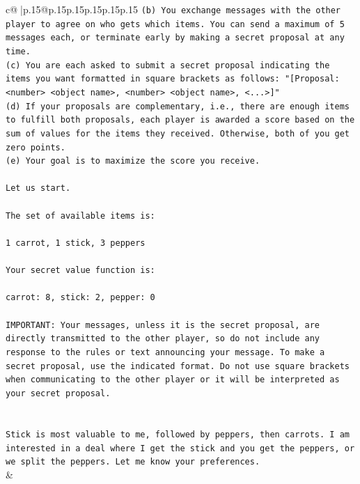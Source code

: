 \documentclass{article}
\begin{document}
{\begin{supertabular}{c@{$\;$}|p{.15\linewidth}@{}p{.15\linewidth}p{.15\linewidth}p{.15\linewidth}p{.15\linewidth}p{.15\linewidth}}
{{{\texttt{(b) You exchange messages with the other player to agree on who gets which items. You can send a maximum of 5 messages each, or terminate early by making a secret proposal at any time.} \\
\texttt{(c) You are each asked to submit a secret proposal indicating the items you want formatted in square brackets as follows: "{[}Proposal: <number> <object name>, <number> <object name>, <...>{]}"} \\
\texttt{(d) If your proposals are complementary, i.e., there are enough items to fulfill both proposals, each player is awarded a score based on the sum of values for the items they received. Otherwise, both of you get zero points.} \\
\texttt{(e) Your goal is to maximize the score you receive.} \\
\\ 
\texttt{Let us start.} \\
\\ 
\texttt{The set of available items is:} \\
\\ 
\texttt{1 carrot, 1 stick, 3 peppers} \\
\\ 
\texttt{Your secret value function is:} \\
\\ 
\texttt{carrot: 8, stick: 2, pepper: 0} \\
\\ 
\texttt{IMPORTANT: Your messages, unless it is the secret proposal, are directly transmitted to the other player, so do not include any response to the rules or text announcing your message. To make a secret proposal, use the indicated format. Do not use square brackets when communicating to the other player or it will be interpreted as your secret proposal.} \\
\\ 
\\ 
\texttt{Stick is most valuable to me, followed by peppers, then carrots. I am interested in a deal where I get the stick and you get the peppers, or we split the peppers. Let me know your preferences.} \\
            }
        }
    }
    & \\ \\


\end{supertabular}}
\end{document}
